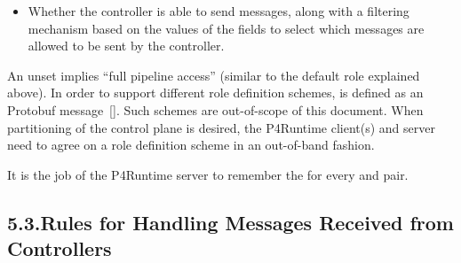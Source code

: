 \documentclass[11pt]{article}
\begin{document}
{\begin{itemize}[noitemsep,topsep=\mdcompacttopsep]
\item{}Whether the controller is able to send  messages, along with a
filtering mechanism based on the values of the  fields to
select which  messages are allowed to be sent by the controller.%
\end{itemize}%

\noindent{}An unset  implies \textquotedblleft{}full pipeline access\textquotedblright{} (similar to the default
role explained above). In order to support different role definition schemes,
 is defined as an  Protobuf message~[]. Such schemes
are out-of-scope of this document. When partitioning of the control plane is
desired, the P4Runtime client(s) and server need to agree on a role definition
scheme in an out-of-band fashion.%

It is the job of the P4Runtime server to remember the  for every
 and  pair.%

\subsection{5.3.\hspace*{0.5em}Rules for Handling  Messages Received from Controllers}\label{sec-arbitration-updates}%

\begin{enumerate}%


\end{enumerate}}
\end{document}
